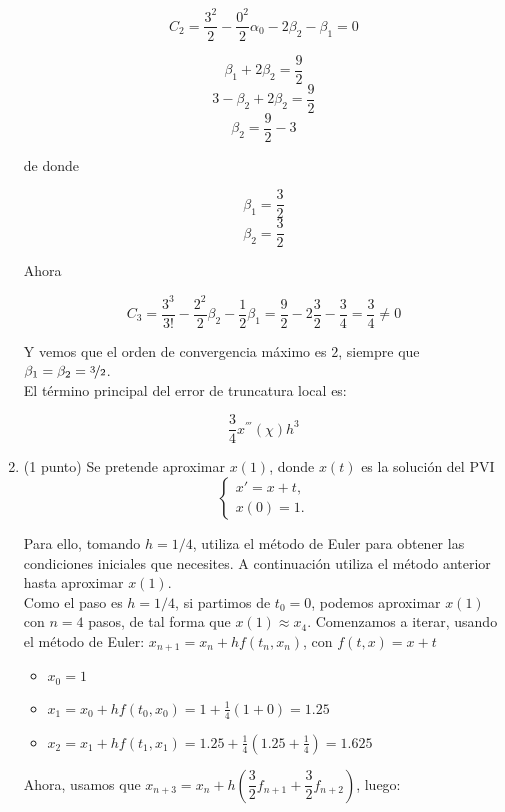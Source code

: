 \documentclass[12pt]{article}
\begin{document}
\begin{ejercicio}[2 puntos]
\begin{enumerate}
        $$C_2 = \dfrac{3^2}{2} - \dfrac{0^2}{2} \alpha_0 - 2 \beta_2 - \beta_1 = 0$$

        $$\beta_1 + 2 \beta_2 = \dfrac{9}{2}$$
        $$3 - \beta_2 + 2\beta_2 = \dfrac{9}{2}$$
        $$\beta_2 = \dfrac{9}{2} - 3$$

        de donde

        $$\beta_1 = \dfrac{3}{2}$$
        $$\beta_2 = \dfrac{3}{2}$$

        Ahora

        $$C_3 = \dfrac{3^3}{3!} - \dfrac{2^2}{2} \beta_2 - \dfrac{1}{2} \beta_1 = \dfrac{9}{2} - 2 \dfrac{3}{2} - \dfrac{3}{4} = \dfrac{3}{4} \neq 0$$

        Y vemos que el orden de convergencia máximo es $2$, siempre que $\beta_1 = \beta_2 = \nicefrac{3}{2}$. \\

        El término principal del error de truncatura local es:

        $$\dfrac{3}{4} x^{'''}(\chi) h^3$$

        \item (1 punto) Se pretende aproximar $x(1)$, donde $x(t)$ es la solución del PVI
        \[
          \begin{cases}
            x' = x + t,\\
            x(0)=1.
          \end{cases}
        \]

        Para ello, tomando $h=1/4$, utiliza el método de Euler para obtener las condiciones iniciales que necesites. A continuación utiliza el método anterior hasta aproximar $x(1)$. \\

        Como el paso es $h = 1/4$, si partimos de $t_0 = 0$, podemos aproximar $x(1)$ con $n=4$ pasos, de tal forma que $x(1) \approx x_4$. Comenzamos a iterar, usando el método de Euler: $x_{n+1} = x_n + h f(t_n, x_n)$, con $f(t,x) = x+t$

        \begin{itemize}
          \item $x_0 = 1$
          \item $x_1 = x_0 + h f(t_0, x_0) = 1 + \frac{1}{4} (1 + 0) = 1.25$
          \item $x_2 = x_1 + h f(t_1, x_1) = 1.25 + \frac{1}{4} (1.25 + \frac{1}{4}) = 1.625$
        \end{itemize}

        Ahora, usamos que $x_{n+3} = x_n + h \left( \dfrac{3}{2} f_{n+1} + \dfrac{3}{2} f_{n+2}\right)$, luego:


\end{enumerate}
\end{ejercicio}
\end{document}
